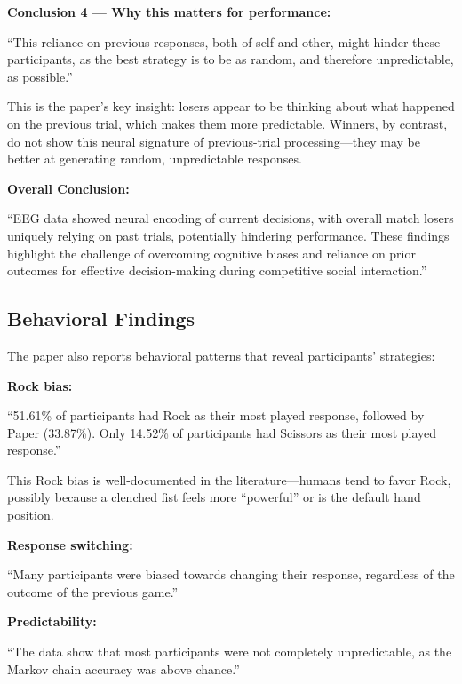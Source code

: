\documentclass[11pt,a4paper]{article}
\begin{document}
\textbf{Conclusion 4 --- Why this matters for performance:}
\begin{paperquote}
``This reliance on previous responses, both of self and other, might hinder these participants, as the best strategy is to be as random, and therefore unpredictable, as possible.''
\end{paperquote}

This is the paper's key insight: losers appear to be thinking about what happened on the previous trial, which makes them more predictable. Winners, by contrast, do not show this neural signature of previous-trial processing---they may be better at generating random, unpredictable responses.

\textbf{Overall Conclusion:}
\begin{paperquote}
``EEG data showed neural encoding of current decisions, with overall match losers uniquely relying on past trials, potentially hindering performance. These findings highlight the challenge of overcoming cognitive biases and reliance on prior outcomes for effective decision-making during competitive social interaction.''
\end{paperquote}

\subsection{Behavioral Findings}
\label{subsec:behavioral_findings}

The paper also reports behavioral patterns that reveal participants' strategies:

\textbf{Rock bias:}
\begin{paperquote}
``51.61\% of participants had Rock as their most played response, followed by Paper (33.87\%). Only 14.52\% of participants had Scissors as their most played response.''
\end{paperquote}

This Rock bias is well-documented in the literature---humans tend to favor Rock, possibly because a clenched fist feels more ``powerful'' or is the default hand position.

\textbf{Response switching:}
\begin{paperquote}
``Many participants were biased towards changing their response, regardless of the outcome of the previous game.''
\end{paperquote}

\textbf{Predictability:}
\begin{paperquote}
``The data show that most participants were not completely unpredictable, as the Markov chain accuracy was above chance.''
\end{paperquote}
\end{document}
